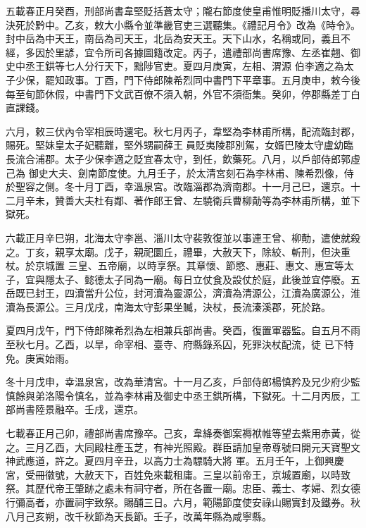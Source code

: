 \begin{pinyinscope}
 五載春正月癸酉，刑部尚書韋堅貶括蒼太守；隴右節度使皇甫惟明貶播川太守，尋決死於黔中。乙亥，敕大小縣令並準畿官吏三選聽集。《禮記月令》改為《時令》。封中岳為中天王，南岳為司天王，北岳為安天王。天下山水，名稱或同，義且不經，多因於里諺，宜令所司各據圖籍改定。丙子，遣禮部尚書席豫、左丞崔翹、御史中丞王鉷等七人分行天下，黜陟官吏。夏四月庚寅，左相、渭源
 伯李適之為太子少保，罷知政事。丁酉，門下侍郎陳希烈同中書門下平章事。五月庚申，敕今後每至旬節休假，中書門下文武百僚不須入朝，外官不須衙集。癸卯，停郡縣差丁白直課錢。



 六月，敕三伏內令宰相辰時還宅。秋七月丙子，韋堅為李林甫所構，配流臨封郡，賜死。堅妹皇太子妃聽離，堅外甥嗣薛王員貶夷陵郡別駕，女婿巴陵太守盧幼臨長流合浦郡。太子少保李適之貶宜春太守，到任，飲藥死。八月，以戶部侍郎郭虛己為
 御史大夫、劍南節度使。九月壬子，於太清宮刻石為李林甫、陳希烈像，侍於聖容之側。冬十月丁酉，幸溫泉宮。改臨淄郡為濟南郡。十一月己巳，還京。十二月辛未，贊善大夫杜有鄰、著作郎王曾、左驍衛兵曹柳勣等為李林甫所構，並下獄死。



 六載正月辛巳朔，北海太守李邕、淄川太守裴敦復並以事連王曾、柳勣，遣使就殺之。丁亥，親享太廟。戊子，親祀圜丘，禮畢，大赦天下，除絞、斬刑，但決重杖。於京城置
 三皇、五帝廟，以時享祭。其章懷、節愍、惠莊、惠文、惠宣等太子，宜與隱太子、懿德太子同為一廟。每日立仗食及設仗於庭，此後並宜停廢。五岳既已封王，四瀆當升公位，封河瀆為靈源公，濟瀆為清源公，江瀆為廣源公，淮瀆為長源公。三月戊戌，南海太守彭果坐贓，決杖，長流溱溪郡，死於路。



 夏四月戊午，門下侍郎陳希烈為左相兼兵部尚書。癸酉，復置軍器監。自五月不雨至秋七月。乙酉，以旱，命宰相、臺寺、府縣錄系囚，死罪決杖配流，徒
 已下特免。庚寅始雨。



 冬十月戊申，幸溫泉宮，改為華清宮。十一月乙亥，戶部侍郎楊慎矜及兄少府少監慎餘與弟洛陽令慎名，並為李林甫及御史中丞王鉷所構，下獄死。十二月丙辰，工部尚書陸景融卒。壬戌，還京。



 七載春正月己卯，禮部尚書席豫卒。己亥，韋絳奏御案褥袱帷等望去紫用赤黃，從之。三月乙酉，大同殿柱產玉芝，有神光照殿。群臣請加皇帝尊號曰開元天寶聖文神武應道，許之。夏四月辛丑，以高力士為驃騎大將
 軍。五月壬午，上御興慶宮，受冊徽號，大赦天下，百姓免來載租庸。三皇以前帝王，京城置廟，以時致祭。其歷代帝王肇跡之處未有祠守者，所在各置一廟。忠臣、義士、孝婦、烈女德行彌高者，亦置祠宇致祭。賜酺三日。六月，範陽節度使安祿山賜實封及鐵券。秋八月己亥朔，改千秋節為天長節。壬子，改萬年縣為咸寧縣。




\end{pinyinscope}

